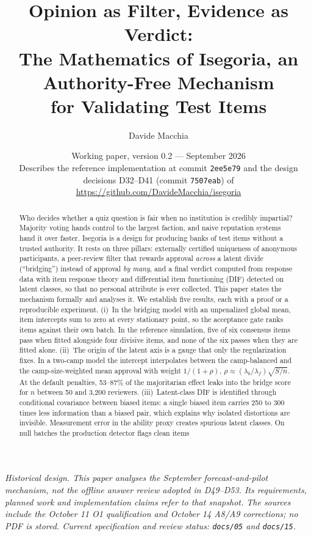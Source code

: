 \documentclass[11pt,a4paper]{article}
\title{Opinion as Filter, Evidence as Verdict:\\
The Mathematics of Isegoria, an Authority-Free Mechanism\\ for Validating Test Items}
\author{Davide Macchia}
\date{Working paper, version 0.2 --- September 2026\\[0.3em]
\small Describes the reference implementation at commit \texttt{2ee5e79} and the design
decisions D32--D41 (commit \texttt{7507eab}) of \url{https://github.com/DavideMacchia/isegoria}}
\begin{document}
\maketitle

\noindent\textit{Historical design. This paper analyses the September forecast-and-pilot
mechanism, not the offline answer review adopted in D49--D53. Its requirements, planned
work and implementation claims refer to that snapshot. The sources include the October
11 O1 qualification and October 14 A8/A9 corrections; no PDF is stored.
Current specification and review status: \texttt{docs/05} and \texttt{docs/15}.}

\begin{abstract}
\noindent
Who decides whether a quiz question is fair when no institution is credibly impartial?
Majority voting hands control to the largest faction, and naive reputation systems hand it
over faster. Isegoria is a design for producing banks of test items without a trusted
authority. It rests on three pillars: externally certified uniqueness of anonymous
participants, a peer-review filter that rewards approval \emph{across} a latent divide
(``bridging'') instead of approval \emph{by many}, and a final verdict computed from
response data with item response theory and differential item functioning (DIF) detected on
latent classes, so that no personal attribute is ever collected. This paper states the
mechanism formally and analyses it. We establish five results, each with a proof or a
reproducible experiment.
(i)~In the bridging model with an unpenalized global mean, item intercepts sum to zero at
every stationary point, so the acceptance gate ranks items against their own batch. In the
reference simulation, five of six consensus items pass when fitted alongside four divisive
items, and none of the six passes when they are fitted alone.
(ii)~The origin of the latent axis is a gauge that only the regularization fixes. In a
two-camp model the intercept interpolates between the camp-balanced and the camp-size-weighted
mean approval with weight $1/(1+\rho)$, $\rho\approx(\lambda_b/\lambda_f)\sqrt{S/n}$. At the
default penalties, 53--87\% of the majoritarian effect leaks into the bridge score for $n$
between 50 and 3{,}200 reviewers.
(iii)~Latent-class DIF is identified through conditional covariance between biased items:
a single biased item carries 250 to 300 times less information than a biased pair, which
explains why isolated distortions are invisible. Measurement error in the ability proxy
creates spurious latent classes. On null batches the production detector flags clean items

\end{abstract}
\end{document}
